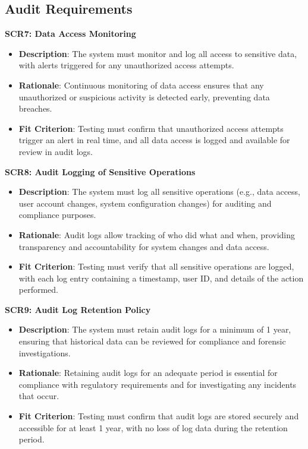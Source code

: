 \documentclass[12pt]{article}
\begin{document}
\subsection{Audit Requirements}
\textbf{SCR7: Data Access Monitoring}
\begin{itemize}
    \item \textbf{Description}: The system must monitor and log all access to
    sensitive data, with alerts triggered for any unauthorized access attempts.
    \item \textbf{Rationale}: Continuous monitoring of data access ensures that
    any unauthorized or suspicious activity is detected early, preventing data
    breaches.
    \item \textbf{Fit Criterion}: Testing must confirm that unauthorized access
    attempts trigger an alert in real time, and all data access is logged and
    available for review in audit logs.
\end{itemize}
\textbf{SCR8: Audit Logging of Sensitive Operations}
\begin{itemize}
    \item \textbf{Description}: The system must log all sensitive operations
    (e.g., data access, user account changes, system configuration changes) for
    auditing and compliance purposes.
    \item \textbf{Rationale}: Audit logs allow tracking of who did what and
    when, providing transparency and accountability for system changes and data
    access.
    \item \textbf{Fit Criterion}: Testing must verify that all sensitive
    operations are logged, with each log entry containing a timestamp, user ID,
    and details of the action performed.
\end{itemize}
\textbf{SCR9: Audit Log Retention Policy}
\begin{itemize}
    \item \textbf{Description}: The system must retain audit logs for a minimum
    of 1 year, ensuring that historical data can be reviewed for compliance and
    forensic investigations.
    \item \textbf{Rationale}: Retaining audit logs for an adequate period is
    essential for compliance with regulatory requirements and for investigating
    any incidents that occur.
    \item \textbf{Fit Criterion}: Testing must confirm that audit logs are
    stored securely and accessible for at least 1 year, with no loss of log data
    during the retention period.
\end{itemize}
\end{document}
